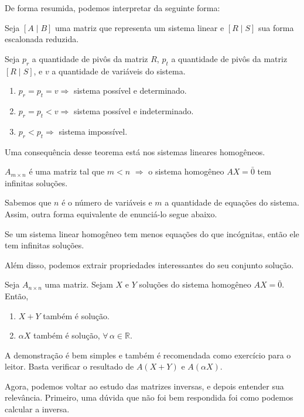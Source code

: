 \documentclass[../main.tex]{subfiles}
\begin{document}
			De forma resumida, podemos interpretar da seguinte forma:
			\begin{teorema}
				Seja $[A\mid B]$ uma matriz que representa um sistema linear e $[R\mid S]$ sua forma escalonada reduzida.
				
				Seja $p_r$ a quantidade de pivôs da matriz $R$, $p_t$ a quantidade de pivôs da matriz $[R\mid S]$, e $v$ a quantidade de variáveis do sistema.
				
				\begin{enumerate}[label=\roman*)]
					\item $p_r=p_t=v \Rightarrow $ sistema possível e determinado.
					\item $p_r=p_t<v \Rightarrow $ sistema possível e indeterminado.
					\item $p_r<p_t \Rightarrow $ sistema impossível. 
				\end{enumerate}
			\end{teorema}
			Uma consequência desse teorema está nos sistemas lineares homogêneos.
			\begin{teorema}
				$A_{m\times n}$ é uma matriz tal que $m<n$ $\Rightarrow$ o sistema homogêneo $AX=\bar{0}$ tem infinitas soluções. 
			\end{teorema}
			Sabemos que $n$ é o número de variáveis e $m$ a quantidade de equações do sistema. Assim, outra forma equivalente de enunciá-lo segue abaixo.
			\begin{teorema}
				Se um sistema linear homogêneo tem menos equações do que incógnitas, então ele tem infinitas soluções.
			\end{teorema}
			Além disso, podemos extrair propriedades interessantes do seu conjunto solução.
			\begin{proposicao}
				Seja $A_{n\times n}$ uma matriz. Sejam $X$ e $Y$ soluções do sistema homogêneo $AX=\bar{0}$. Então,
				\begin{enumerate}[label=\roman*)]
					\item $X+Y$ também é solução.
					\item $\alpha X$ também é solução, $\forall\, \alpha \in \mathbb{R}$.
				\end{enumerate}
			\end{proposicao}
			A demonstração é bem simples e também é recomendada como exercício para o leitor. Basta verificar o resultado de $A(X+Y)$ e $A(\alpha X)$.
			
			Agora, podemos voltar ao estudo das matrizes inversas, e depois entender sua relevância. Primeiro, uma dúvida que não foi bem respondida foi como podemos calcular a inversa.
			
\end{document}
